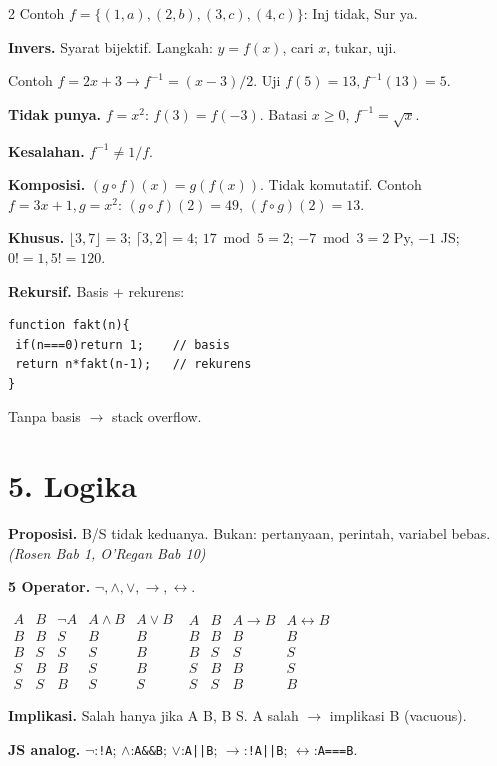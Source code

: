 \documentclass[8pt,a4paper]{extarticle}
\newcommand{\h}[1]{\textbf{#1}}
\newcommand{\src}[1]{\textit{(#1)}}
\begin{document}
\begin{multicols*}{2}
	Contoh $f{=}\{(1,a),(2,b),(3,c),(4,c)\}$: Inj tidak, Sur ya.

	\h{Invers.} Syarat bijektif. Langkah: $y{=}f(x)$, cari $x$, tukar, uji.

	Contoh $f{=}2x{+}3\to f^{-1}{=}(x{-}3)/2$. Uji $f(5){=}13,f^{-1}(13){=}5$.

	\h{Tidak punya.} $f{=}x^2$: $f(3){=}f({-}3)$. Batasi $x\ge0$, $f^{-1}{=}\sqrt{x}$.

	\h{Kesalahan.} $f^{-1}\neq1/f$.

	\h{Komposisi.} $(g\circ f)(x){=}g(f(x))$. Tidak komutatif. Contoh $f{=}3x{+}1,g{=}x^2$: $(g\circ f)(2){=}49$, $(f\circ g)(2){=}13$.

	\h{Khusus.} $\lfloor3{,}7\rfloor{=}3$; $\lceil3{,}2\rceil{=}4$; $17\bmod5{=}2$; ${-}7\bmod3{=}2$ Py, ${-}1$ JS; $0!{=}1,5!{=}120$.

	\h{Rekursif.} Basis + rekurens:
	\begin{lstlisting}
function fakt(n){
 if(n===0)return 1;    // basis
 return n*fakt(n-1);   // rekurens
}
\end{lstlisting}
	Tanpa basis $\to$ stack overflow.

	\section*{5. Logika}

	\h{Proposisi.} B/S tidak keduanya. Bukan: pertanyaan, perintah, variabel bebas. \src{Rosen Bab 1, O'Regan Bab 10}

	\h{5 Operator.} $\neg,\wedge,\vee,\to,\leftrightarrow$.

	$\begin{smallmatrix}A&B&\neg A&A\wedge B&A\vee B\\B&B&S&B&B\\B&S&S&S&B\\S&B&B&S&B\\S&S&B&S&S\end{smallmatrix}$
	$\begin{smallmatrix}A&B&A\to B&A\leftrightarrow B\\B&B&B&B\\B&S&S&S\\S&B&B&S\\S&S&B&B\end{smallmatrix}$

	\h{Implikasi.} Salah hanya jika A B, B S. A salah $\to$ implikasi B (vacuous).

	\h{JS analog.} $\neg$:\texttt{!A}; $\wedge$:\texttt{A\&\&B}; $\vee$:\texttt{A||B}; $\to$:\texttt{!A||B}; $\leftrightarrow$:\texttt{A===B}.


\end{multicols*}
\end{document}

